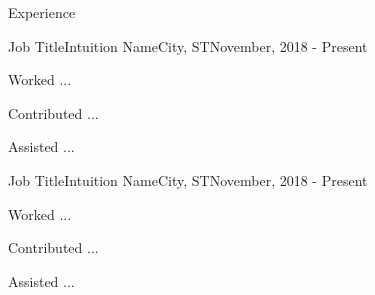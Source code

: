\begin{resume_section}{Experience}
  \begin{resume_employer}{Job Title}{Intuition Name}{City, ST}{November, 2018 - Present}
    \item Worked ...
    \item Contributed ...
    \item Assisted ...
  \end{resume_employer}
  \begin{resume_employer}{Job Title}{Intuition Name}{City, ST}{November, 2018 - Present}
    \item Worked ...
    \item Contributed ...
    \item Assisted ...
  \end{resume_employer}
    \vspace{-.5cm}
\end{resume_section}